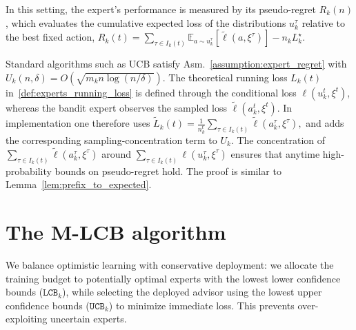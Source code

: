 \documentclass[a4paper,14pt]{extarticle}
\theoremstyle{plain}
\newcommand{\algname}[1]{{\textsf  #1}}
\newcommand{\LCB}{\texttt{LCB}}
\newcommand{\UCB}{\texttt{UCB}}
\begin{document}
In this setting, the expert's performance is measured by its pseudo-regret $R_k(n)$, which evaluates the cumulative expected loss of the distributions $u_k^\tau$ relative to the best fixed action, $R_k(t) = \sum_{\tau \in I_k(t)} \mathbb{E}_{a \sim u_k^\tau} [\tilde{\ell}(a, \xi^\tau)] - n_k L_k^\star.$

Standard algorithms such as \algname{UCB} satisfy Asm.~\ref{assumption:expert_regret} with $U_k(n, \delta) = O(\sqrt{m_k n \log(n/\delta)})$. The theoretical running loss $L_k(t)$ in~\eqref{def:experts_running_loss} is defined through the conditional loss $\ell(u_k^t,\xi^t)$, whereas the bandit expert observes the sampled loss $\tilde{\ell}(a_k^t,\xi^t)$. In implementation one therefore uses $\tilde L_k(t)=\frac{1}{n_k^t}\sum_{\tau\in I_k(t)}\tilde{\ell}(a_k^\tau,\xi^\tau),$
and adds the corresponding sampling-concentration term to $U_k$. The concentration of $\sum_{\tau\in I_k(t)} \tilde{\ell}(a_k^\tau, \xi^\tau)$ around $\sum_{\tau\in I_k(t)} \ell(u_k^\tau, \xi^\tau)$ ensures that anytime high-probability bounds on pseudo-regret hold. The proof is similar to Lemma~\ref{lem:prefix_to_expected}.

\section{The \algname{M-LCB} algorithm}
\label{sec:algorithm}

We balance optimistic learning with conservative deployment: we allocate the training budget to potentially optimal experts with the lowest lower confidence bounds ($\LCB_k$), while selecting the deployed advisor using the lowest upper confidence bounds ($\UCB_k$) to minimize immediate loss. This prevents over-exploiting uncertain experts.
\end{document}
